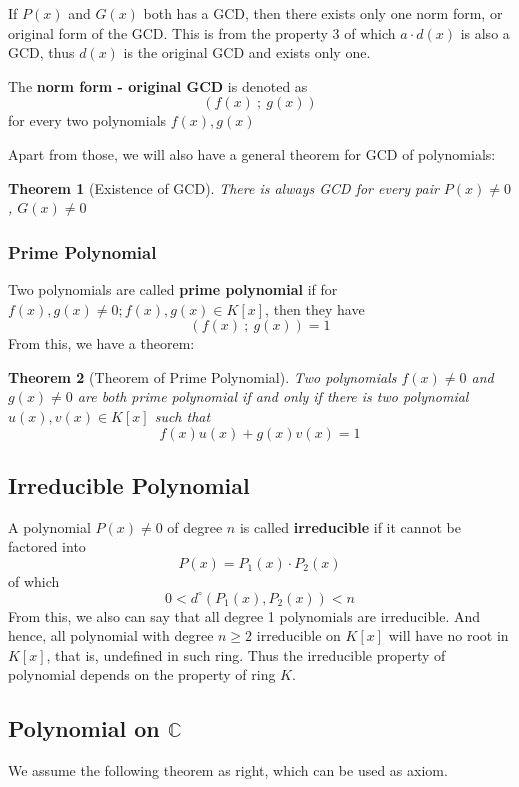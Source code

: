 \documentclass{book}
\newtheorem{Theorem}{Theorem}[section]
\numberwithin{identity}{subsection}
\numberwithin{Rule}{subsection}
\numberwithin{Theorem}{subsection}
\numberwithin{Definition}{subsection}
\begin{document}
If $P(x)$ and $G(x)$ both has a GCD, then there exists only one norm form, or original form of the GCD. This is from the property 3 of which $a\cdot d(x)$ is also a GCD, thus $d(x)$ is the original GCD and exists only one. 

The \textbf{norm form - original GCD} is denoted as $$(f(x)\:;\:g(x))$$ for every two polynomials $f(x),g(x)$

Apart from those, we will also have a general theorem for GCD of polynomials: 

\begin{Theorem}[Existence of GCD]
    There is always GCD for every pair $P(x)\neq 0$, $G(x)\neq 0$
\end{Theorem}

\subsubsection{Prime Polynomial}

Two polynomials are called \textbf{prime polynomial} if for $f(x),g(x)\neq 0; f(x), g(x) \in K[x]$, then they have $$(f(x)\:;\: g(x))=1$$
From this, we have a theorem: 

\begin{Theorem}[Theorem of Prime Polynomial]
    Two polynomials $f(x)\neq 0$ and $g(x)\neq 0$ are both prime polynomial if and only if there is two polynomial $u(x),v(x)\in K[x]$ such that $$f(x)u(x)+g(x)v(x)=1$$
\end{Theorem}

\subsection{Irreducible Polynomial}

A polynomial $P(x)\neq 0$ of degree $n$ is called \textbf{irreducible} if it cannot be factored into $$P(x)=P_{1}(x)\cdot P_{2}(x)$$  of which $$0<d^{\circ}(P_{1}(x), P_{2}(x))<n$$
From this, we also can say that all degree 1 polynomials are irreducible. And hence, all polynomial with degree $n\geq2$ irreducible on $K[x]$ will have no root in $K[x]$, that is, undefined in such ring. Thus the irreducible property of polynomial depends on the property of ring $K$. 

\subsection{Polynomial on $\mathbb{C}$}

We assume the following theorem as right, which can be used as axiom. 
\end{document}

